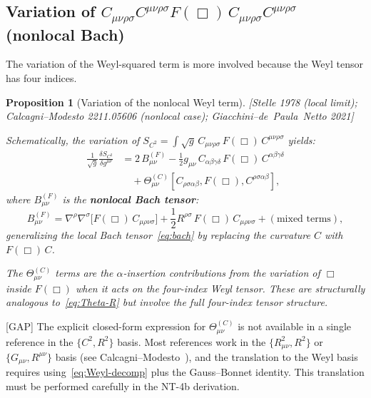 \documentclass[12pt,a4paper]{article}
\newtheorem{proposition}{Proposition}[section]
\theoremstyle{definition}
\theoremstyle{remark}
\newcommand{\Weylsq}{C_{\mu\nu\rho\sigma}C^{\mu\nu\rho\sigma}}
\newcommand{\fromlit}[1]{\textcolor{blue!70!black}{\textsf{[#1]}}}
\newcommand{\gap}{\textcolor{red!80!black}{\textsf{[GAP]}}}
\begin{document}
\subsection{Variation of $\Weylsq F(\Box)\,\Weylsq$ (nonlocal Bach)}

The variation of the Weyl-squared term is more involved because the
Weyl tensor has four indices.

\begin{proposition}[Variation of the nonlocal Weyl term]
\label{prop:var-C2FC2}
\fromlit{Stelle 1978 (local limit);
Calcagni--Modesto 2211.05606 (nonlocal case);
Giacchini--de~Paula~Netto 2021}

Schematically, the variation of
$S_{C^2} = \int\sqrt{g}\,C_{\mu\nu\rho\sigma}\,F(\Box)\,C^{\mu\nu\rho\sigma}$
yields:
\begin{equation}\label{eq:var-C2}
\begin{split}
  \frac{1}{\sqrt{g}}\frac{\delta S_{C^2}}{\delta g^{\mu\nu}}
  &= 2\,B_{\mu\nu}^{(F)}
    - \frac{1}{2}g_{\mu\nu}\,C_{\alpha\beta\gamma\delta}\,
      F(\Box)\,C^{\alpha\beta\gamma\delta} \\
  &\quad + \Theta_{\mu\nu}^{(C)}[C_{\rho\sigma\alpha\beta},
    F(\Box), C^{\rho\sigma\alpha\beta}],
\end{split}
\end{equation}
where $B_{\mu\nu}^{(F)}$ is the \textbf{nonlocal Bach tensor}:
\begin{equation}\label{eq:nonlocal-bach}
  B_{\mu\nu}^{(F)} = \nabla^\rho\nabla^\sigma
    \big[F(\Box)\,C_{\mu\rho\nu\sigma}\big]
    + \frac{1}{2}R^{\rho\sigma}\,F(\Box)\,C_{\mu\rho\nu\sigma}
    + (\text{mixed terms}),
\end{equation}
generalizing the local Bach tensor~\eqref{eq:bach} by replacing
the curvature $C$ with $F(\Box)\,C$.

The $\Theta_{\mu\nu}^{(C)}$ terms are the $\alpha$-insertion
contributions from the variation of $\Box$ inside $F(\Box)$ when
it acts on the four-index Weyl tensor.  These are structurally
analogous to~\eqref{eq:Theta-R} but involve the full four-index
tensor structure.
\end{proposition}

\gap\; The explicit closed-form expression for
$\Theta_{\mu\nu}^{(C)}$ is not available in a single reference in the
$\{C^2, R^2\}$ basis.  Most references work in the
$\{R_{\mu\nu}^2, R^2\}$ or $\{G_{\mu\nu}, R^{\mu\nu}\}$ basis
(see Calcagni--Modesto~\cite{CalcagniModesto2022}), and the translation
to the Weyl basis requires using~\eqref{eq:Weyl-decomp} plus the
Gauss--Bonnet identity.  This translation must be performed carefully
in the NT-4b derivation.
\end{document}
